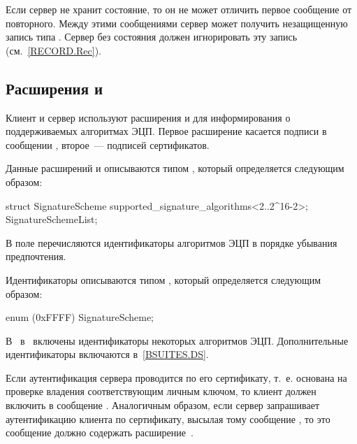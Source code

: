 
\begin{note}
Если сервер не хранит состояние, то он не может отличить 
первое сообщение  от повторного. Между этими 
сообщениями сервер может получить незащищенную запись типа 
. Сервер без состояния должен игнорировать эту запись 
(см.~\ref{RECORD.Rec}).
\end{note}

\subsection{Расширения  и 
}\label{HS.Ext.sa} 

Клиент и сервер используют расширения  и 
 для информирования о поддерживаемых алгоритмах 
ЭЦП. Первое расширение касается подписи в сообщении 
, второе~--- подписей сертификатов.

Данные расширений  и 
 описываются типом , который 
определяется следующим образом:

\begin{codeblock}
struct {
  SignatureScheme supported_signature_algorithms<2..2^16-2>;
} SignatureSchemeList;
\end{codeblock}

В поле  перечисляются идентификаторы 
алгоритмов ЭЦП в порядке убывания предпочтения.

Идентификаторы описываются типом , который определяется 
следующим образом:

\begin{codeblock}
enum { (0xFFFF) } SignatureScheme;
\end{codeblock}

В~\cite{RFC8446} в~ включены идентификаторы некоторых
алгоритмов ЭЦП. Дополнительные идентификаторы включаются в~\ref{BSUITES.DS}.

Если аутентификация сервера проводится по его сертификату, т.~е. основана на 
проверке владения соответствующим личным ключом, то клиент должен включить 
 в сообщение .
%
Аналогичным образом, если сервер запрашивает аутентификацию клиента по 
сертификату, высылая тому сообщение , то это 
сообщение должно содержать расширение~.

